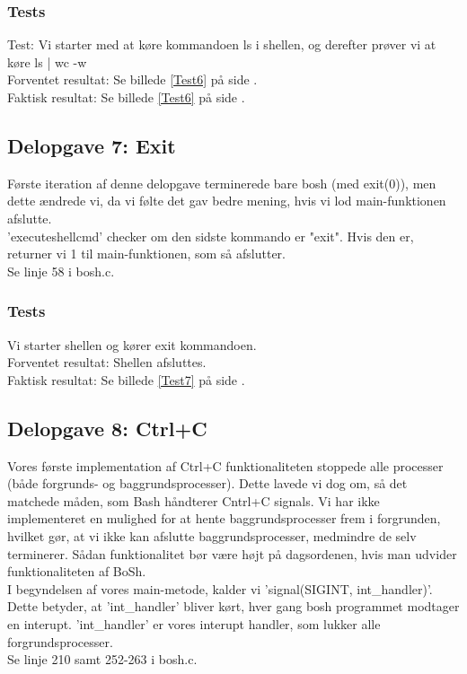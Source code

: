 \subsubsection{Tests}
Test: Vi starter med at køre kommandoen ls i shellen, og derefter prøver vi at køre ls | wc -w
\\Forventet resultat: Se billede \ref{Test6} på side \pageref{Test6}.
\\Faktisk resultat: Se billede \ref{Test6} på side \pageref{Test6}.

\subsection{Delopgave 7: Exit}
\label{D7}
Første iteration af denne delopgave terminerede bare bosh (med exit(0)), men dette ændrede vi, da vi følte det gav bedre mening, hvis vi lod main-funktionen afslutte.
\\'executeshellcmd' checker om den sidste kommando er "exit". Hvis den er, returner vi 1 til main-funktionen, som så afslutter.
\\Se linje 58 i bosh.c.
\subsubsection{Tests}
Vi starter shellen og kører exit kommandoen.
\\Forventet resultat: Shellen afsluttes.
\\Faktisk resultat: Se billede \ref{Test7} på side \pageref{Test7}.

\subsection{Delopgave 8: Ctrl+C}
\label{D8}
Vores første implementation af Ctrl+C funktionaliteten stoppede alle processer (både forgrunds- og baggrundsprocesser). Dette lavede vi dog om, så det matchede måden, som Bash håndterer Cntrl+C signals. Vi har ikke implementeret en mulighed for at hente baggrundsprocesser frem i forgrunden, hvilket gør, at vi ikke kan afslutte baggrundsprocesser, medmindre de selv terminerer. Sådan funktionalitet bør være højt på dagsordenen, hvis man udvider funktionaliteten af BoSh.
\\I begyndelsen af vores main-metode, kalder vi 'signal(SIGINT, int\_handler)'. Dette betyder, at 'int\_handler' bliver kørt, hver gang bosh programmet modtager en interupt. 'int\_handler' er vores interupt handler, som lukker alle forgrundsprocesser. 
\\Se linje 210 samt 252-263 i bosh.c.
